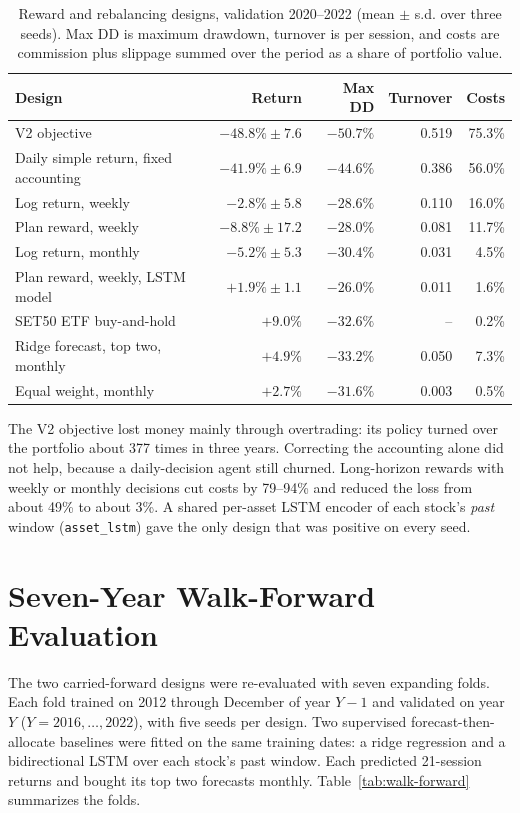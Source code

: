 \begin{table}[H]
\centering
\small
\caption{Reward and rebalancing designs, validation 2020--2022 (mean $\pm$ s.d. over three seeds). Max DD is maximum drawdown, turnover is per session, and costs are commission plus slippage summed over the period as a share of portfolio value.}
\label{tab:reward-designs}
\begin{tabularx}{\textwidth}{@{}Yrrrr@{}}
\toprule
Design & Return & Max DD & Turnover & Costs \\
\midrule
V2 objective & $-48.8\% \pm 7.6$ & $-50.7\%$ & 0.519 & 75.3\% \\
Daily simple return, fixed accounting & $-41.9\% \pm 6.9$ & $-44.6\%$ & 0.386 & 56.0\% \\
Log return, weekly & $-2.8\% \pm 5.8$ & $-28.6\%$ & 0.110 & 16.0\% \\
Plan reward, weekly & $-8.8\% \pm 17.2$ & $-28.0\%$ & 0.081 & 11.7\% \\
Log return, monthly & $-5.2\% \pm 5.3$ & $-30.4\%$ & 0.031 & 4.5\% \\
Plan reward, weekly, LSTM model & $+1.9\% \pm 1.1$ & $-26.0\%$ & 0.011 & 1.6\% \\
\midrule
SET50 ETF buy-and-hold & $+9.0\%$ & $-32.6\%$ & -- & 0.2\% \\
Ridge forecast, top two, monthly & $+4.9\%$ & $-33.2\%$ & 0.050 & 7.3\% \\
Equal weight, monthly & $+2.7\%$ & $-31.6\%$ & 0.003 & 0.5\% \\
\bottomrule
\end{tabularx}
\end{table}

The V2 objective lost money mainly through overtrading: its policy turned over the portfolio about
377 times in three years. Correcting the accounting alone did not help, because a daily-decision agent
still churned. Long-horizon rewards with weekly or monthly decisions cut costs by 79--94\% and
reduced the loss from about 49\% to about 3\%. A shared per-asset LSTM encoder of each stock's
\emph{past} window (\texttt{asset\_lstm}) gave the only design that was positive on every seed.

\section{Seven-Year Walk-Forward Evaluation}

The two carried-forward designs were re-evaluated with seven expanding folds. Each fold trained on
2012 through December of year $Y-1$ and validated on year $Y$ ($Y=2016,\dots,2022$), with five seeds per
design. Two supervised forecast-then-allocate baselines were fitted on the same training dates: a ridge
regression and a bidirectional LSTM over each stock's past window. Each predicted 21-session returns
and bought its top two forecasts monthly. Table~\ref{tab:walk-forward} summarizes the folds.

